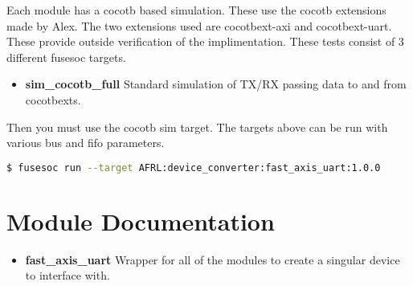 Each module has a cocotb based simulation. These use the cocotb extensions made by Alex.
The two extensions used are cocotbext-axi and cocotbext-uart. These provide outside verification
of the implimentation. These tests consist of 3 different fusesoc targets.

\begin{itemize}
  \item \textbf{sim\_cocotb\_full} Standard simulation of TX/RX passing data to and from cocotbexts.
\end{itemize}

Then you must use the cocotb sim target. The targets above can be run with various bus and fifo parameters.
\begin{lstlisting}[language=bash]
  $ fusesoc run --target AFRL:device_converter:fast_axis_uart:1.0.0
\end{lstlisting}

\newpage

\section{Module Documentation} \label{Module Documentation}

\begin{itemize}
\item \textbf{fast\_axis\_uart} Wrapper for all of the modules to create a singular device to interface with.\\
\end{itemize}


